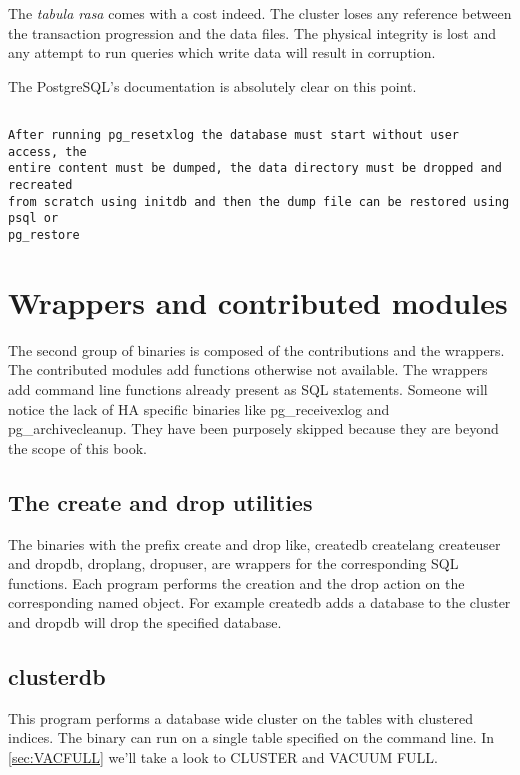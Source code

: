 The \textit{tabula rasa} comes with a cost indeed. The cluster loses any
reference between the transaction progression and the data files. The physical
integrity is lost and any attempt to run queries which write data will result
in corruption.\newline

The PostgreSQL's documentation is absolutely clear on this point.

\begin{verbatim}

After running pg_resetxlog the database must start without user access, the
entire content must be dumped, the data directory must be dropped and recreated
from scratch using initdb and then the dump file can be restored using psql or
pg_restore

\end{verbatim}

\section{Wrappers and contributed modules}

The second group of binaries is composed of the contributions and the wrappers.
The contributed modules add functions otherwise not available. The wrappers add
command line functions already present as SQL statements. Someone will notice
the lack of HA specific binaries like pg\_receivexlog and pg\_archivecleanup.
They have been purposely skipped because they are beyond the scope of this
book.

\subsection{The create and drop utilities}

The binaries with the prefix create and drop like, createdb createlang
createuser and dropdb, droplang, dropuser, are wrappers for the corresponding
SQL functions. Each program performs the creation and the drop action on the
corresponding named object. For example createdb adds a database to the cluster
and dropdb will drop the specified database.

\subsection{clusterdb}

This program performs a database wide cluster on the tables with clustered
indices. The binary can run on a single table specified on the command line. In
\ref{sec:VACFULL} we'll take a look to CLUSTER and VACUUM FULL.

